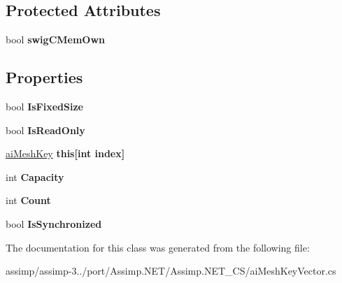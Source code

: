 \subsection*{Protected Attributes}
\begin{DoxyCompactItemize}
\item 
\hypertarget{classai_mesh_key_vector_ab5fcba6a77aeaeb7411865bc1ba7196f}{bool {\bfseries swig\+C\+Mem\+Own}}\label{classai_mesh_key_vector_ab5fcba6a77aeaeb7411865bc1ba7196f}

\end{DoxyCompactItemize}
\subsection*{Properties}
\begin{DoxyCompactItemize}
\item 
\hypertarget{classai_mesh_key_vector_afb607e41efbff79eec94a8b57e51d276}{bool {\bfseries Is\+Fixed\+Size}}\label{classai_mesh_key_vector_afb607e41efbff79eec94a8b57e51d276}

\item 
\hypertarget{classai_mesh_key_vector_a35fffd37a468a91dcaff27e76b7bb47f}{bool {\bfseries Is\+Read\+Only}}\label{classai_mesh_key_vector_a35fffd37a468a91dcaff27e76b7bb47f}

\item 
\hypertarget{classai_mesh_key_vector_aab35ceea4f446b8f3b31d6437de7c83c}{\hyperlink{structai_mesh_key}{ai\+Mesh\+Key} {\bfseries this\mbox{[}int index\mbox{]}}}\label{classai_mesh_key_vector_aab35ceea4f446b8f3b31d6437de7c83c}

\item 
\hypertarget{classai_mesh_key_vector_ac9e197baa6cd7a29bd7a2408ec827a1e}{int {\bfseries Capacity}}\label{classai_mesh_key_vector_ac9e197baa6cd7a29bd7a2408ec827a1e}

\item 
\hypertarget{classai_mesh_key_vector_add140035e050de1083f6fbade2e886a6}{int {\bfseries Count}}\label{classai_mesh_key_vector_add140035e050de1083f6fbade2e886a6}

\item 
\hypertarget{classai_mesh_key_vector_af4d8b90e1a673cd8f0c280232389c83a}{bool {\bfseries Is\+Synchronized}}\label{classai_mesh_key_vector_af4d8b90e1a673cd8f0c280232389c83a}

\end{DoxyCompactItemize}


The documentation for this class was generated from the following file\+:\begin{DoxyCompactItemize}
\item 
assimp/assimp-\/3../port/\+Assimp.\+N\+E\+T/\+Assimp.\+N\+E\+T\+\_\+\+C\+S/ai\+Mesh\+Key\+Vector.\+cs\end{DoxyCompactItemize}
